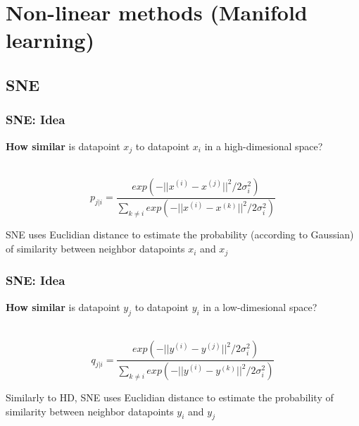 \documentclass{beamer}
\begin{document}
    \section{Non-linear methods (Manifold learning)}
    \subsection{SNE}
    

    \begin{frame}
        \frametitle{SNE: Idea}
        \textbf{How similar} is datapoint $x_j$ to datapoint $x_i$ in a high-dimesional space?\\~\\
        
        \begin{center}
            $$p_{j|i}=\frac{exp{(-||x^{(i)}-x^{(j)}||^2/2\sigma_i^2)}}{
                \sum_{k\not=i}^{} exp{(-||x^{(i)}-x^{(k)}||^2/2\sigma_i^2)}}$$
        \end{center}
        \bigskip
        SNE uses Euclidian distance to estimate the probability (according to Gaussian) of similarity between neighbor datapoints $x_i$ and $x_j$
    \end{frame}


    \begin{frame}
        \frametitle{SNE: Idea}
        \textbf{How similar} is datapoint $y_j$ to datapoint $y_i$ in a low-dimesional space?\\~\\
        
        \begin{center}
            $$q_{j|i}=\frac{exp{(-||y^{(i)}-y^{(j)}||^2/2\sigma_i^2)}}{
                \sum_{k\not=i}^{} exp{(-||y^{(i)}-y^{(k)}||^2/2\sigma_i^2)}}$$
        \end{center}
        \bigskip
        Similarly to HD, SNE uses Euclidian distance to estimate the probability of similarity between neighbor datapoints $y_i$ and $y_j$
    \end{frame}
\end{document}
